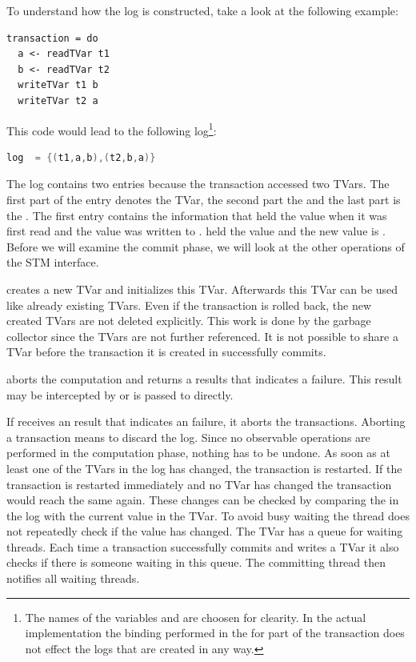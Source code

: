 To understand how the log is constructed, take a look at the following example:
\begin{lstlisting}
transaction = do
  a <- readTVar t1
  b <- readTVar t2
  writeTVar t1 b
  writeTVar t2 a
\end{lstlisting}
This code would lead to the following log\footnote{The names of the variables  and  are choosen
for clearity. In the actual implementation the binding performed in the for part of the transaction does not
effect the logs that are created in any way.}:
\begin{lstlisting}[language=C]
 log  = {(t1,a,b),(t2,b,a)} 
\end{lstlisting}
The log contains two entries because the transaction accessed two TVars. The first part of the entry denotes the TVar, the second
part the  and the last part is the . The first entry contains the information that 
held the value  when it was first read and the value  was written to .  held the value  
and the new value is . Before we will examine the commit phase, we will look at the other operations of the STM interface.

 creates a new TVar and initializes this TVar. Afterwards this TVar can be used like already existing TVars.
Even if the transaction is rolled back, the new created TVars are not deleted explicitly. This work is done by the garbage
collector since the TVars are not further referenced. It is not possible to share a TVar before the transaction it is created in
successfully commits.

 aborts the computation and returns a results that indicates a failure. This result may be intercepted by 
 or is passed to  directly. 

If  receives an result that indicates an failure, it aborts the transactions. 
Aborting a transaction means to discard the log. Since no observable operations are performed in the computation phase, nothing has to be undone. 
As soon as at least one of the TVars in the log has changed, the transaction is restarted. If the transaction is restarted immediately and no 
TVar has changed the transaction would reach the same  again. These changes can be checked by comparing the  in
the log with the current value in the TVar. To avoid busy waiting the thread does not repeatedly check if the value has changed. The TVar has a 
queue for waiting threads. Each time a transaction successfully commits and writes a TVar it also checks if there is someone waiting in 
this queue. The committing thread then notifies all waiting threads.


